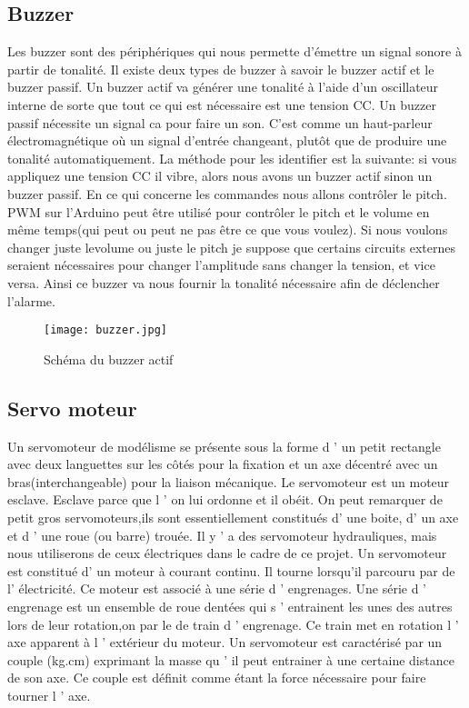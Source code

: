 \documentclass[12pt, openany]{report}
\begin{document}
   \subsection{ Buzzer}
   Les buzzer sont des périphériques qui nous permette d'émettre un signal sonore à partir de tonalité. Il existe deux types de buzzer à savoir le buzzer actif et le buzzer passif.	  		         							    Un buzzer actif va générer une tonalité à l'aide d'un oscillateur interne de sorte que tout ce qui est nécessaire est une tension CC. Un buzzer passif nécessite un signal ca pour faire un son. C'est comme un haut-parleur électromagnétique où un signal d'entrée changeant, plutôt que de produire une tonalité automatiquement.
   La méthode pour les identifier est la suivante: si vous appliquez une tension CC il vibre, alors nous avons un buzzer actif sinon un buzzer passif.
   En ce qui concerne les commandes nous allons contrôler le pitch. PWM sur l'Arduino peut être utilisé pour contrôler le pitch et le volume en même temps(qui peut ou peut ne pas être ce que vous voulez). Si nous voulons changer juste levolume ou juste le pitch je suppose que certains circuits externes seraient nécessaires pour changer l'amplitude sans changer la tension, et vice versa. Ainsi ce buzzer va nous fournir la tonalité nécessaire afin de déclencher l'alarme.
  \begin{figure}[!h]
                  \centering
 \texttt{[image: buzzer.jpg]} 
           \caption{Schéma du buzzer actif}
                 		          		
  \end{figure}  		         				    	\subsection{Servo moteur}	
  Un servomoteur de modélisme se présente sous la forme d ’ un petit rectangle avec deux languettes sur les côtés pour la fixation et un axe décentré avec un bras(interchangeable) pour la liaison mécanique. Le servomoteur est un moteur esclave. Esclave parce que l ’ on lui ordonne et il obéit. On peut
  remarquer de petit gros servomoteurs,ils sont essentiellement constitués d’ une boite, d’ un axe et d ’ une roue (ou barre) trouée. Il y ’ a des servomoteur hydrauliques, mais nous utiliserons de ceux électriques dans le cadre de ce projet. Un servomoteur est constitué d’ un moteur à courant continu. Il tourne lorsqu'il parcouru par de l’ électricité. Ce moteur est associé à une série d ’ engrenages. Une série d ’ engrenage est un ensemble de roue dentées qui s ’ entrainent les unes des autres lors de leur rotation,on par le de train d ’ engrenage. Ce train met en rotation l ’ axe apparent à l ’ extérieur du moteur. Un servomoteur est caractérisé par un couple (kg.cm) exprimant la masse qu ’ il peut entrainer à une certaine distance de son axe. Ce couple est définit comme étant la force nécessaire pour faire tourner l ’ axe.
\end{document}
